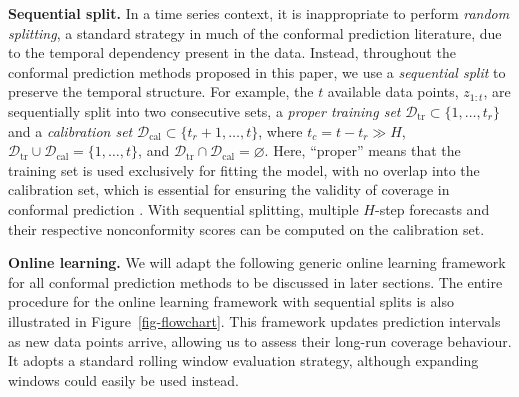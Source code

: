 \documentclass[
  11pt,
  12pt]{article}
\theoremstyle{plain}
\theoremstyle{remark}
\begin{document}
\textbf{Sequential split.} In a time series context, it is inappropriate
to perform \emph{random splitting}, a standard strategy in much of the
conformal prediction literature, due to the temporal dependency present
in the data. Instead, throughout the conformal prediction methods
proposed in this paper, we use a \emph{sequential split} to preserve the
temporal structure. For example, the \(t\) available data points,
\(z_{1:t}\), are sequentially split into two consecutive sets, a
\emph{proper training set}
\(\mathcal{D}_{\text{tr}} \subset \{1,\ldots,t_r\}\) and a
\emph{calibration set}
\(\mathcal{D}_{\text{cal}} \subset \{t_r+1,\ldots,t\}\), where
\(t_c=t-t_r \gg H\),
\(\mathcal{D}_{\text{tr}} \cup \mathcal{D}_{\text{cal}} = \{1, \ldots, t\}\),
and
\(\mathcal{D}_{\text{tr}} \cap \mathcal{D}_{\text{cal}} = \varnothing\).
Here, ``proper'' means that the training set is used exclusively for
fitting the model, with no overlap into the calibration set, which is
essential for ensuring the validity of coverage in conformal prediction
\citep{papadopoulos2007}. With sequential splitting, multiple \(H\)-step
forecasts and their respective nonconformity scores can be computed on
the calibration set.

\textbf{Online learning.} We will adapt the following generic online
learning framework for all conformal prediction methods to be discussed
in later sections. The entire procedure for the online learning
framework with sequential splits is also illustrated in
Figure~\ref{fig-flowchart}. This framework updates prediction intervals
as new data points arrive, allowing us to assess their long-run coverage
behaviour. It adopts a standard rolling window evaluation strategy,
although expanding windows could easily be used instead.
\end{document}

